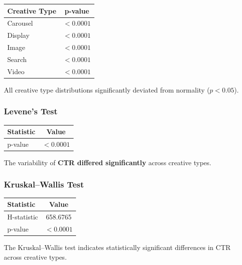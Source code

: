 \begin{table}[H]
	\centering
	\begin{tabular}{lc}
		\toprule
		Creative Type & p-value \\
		\midrule
		Carousel & $<0.0001$ \\
		Display & $<0.0001$ \\
		Image & $<0.0001$ \\
		Search & $<0.0001$ \\
		Video & $<0.0001$ \\
		\bottomrule
	\end{tabular}
\end{table}

All creative type distributions significantly deviated from normality ($p<0.05$).

\vspace{0.3cm}

\subsubsection{Levene's Test}

\begin{table}[H]
	\centering
	\begin{tabular}{lc}
		\toprule
		Statistic & Value \\
		\midrule
		p-value & $<0.0001$ \\
		\bottomrule
	\end{tabular}
\end{table}

The variability of \textbf{CTR differed significantly} across creative types.

\vspace{0.3cm}

\subsubsection{Kruskal--Wallis Test}

\begin{table}[H]
	\centering
	\begin{tabular}{lc}
		\toprule
		Statistic & Value \\
		\midrule
		H-statistic & 658.6765 \\
		p-value & $<0.0001$ \\
		\bottomrule
	\end{tabular}
\end{table}

The Kruskal--Wallis test indicates statistically significant differences in CTR across creative types.

